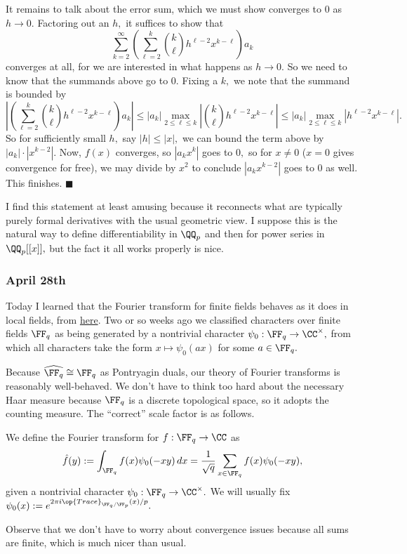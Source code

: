 It remains to talk about the error sum, which we must show converges to $0$ as $h\to0.$ Factoring out an $h,$ it suffices to show that
\[\sum_{k=2}^\infty\left(\sum_{\ell=2}^k\binom k\ell h^{\ell-2}x^{k-\ell}\right)a_k\]
converges at all, for we are interested in what happens as $h\to0.$ So we need to know that the summands above go to $0.$ Fixing a $k,$ we note that the summand is bounded by
\[\left|\left(\sum_{\ell=2}^k\binom k\ell h^{\ell-2}x^{k-\ell}\right)a_k\right|\le|a_k|\max_{2\le\ell\le k}\left|\binom k\ell h^{\ell-2}x^{k-\ell}\right|\le|a_k|\max_{2\le\ell\le k}\left|h^{\ell-2}x^{k-\ell}\right|.\]
So for sufficiently small $h,$ say $|h|\le|x|,$ we can bound the term above by $|a_k|\cdot\left|x^{k-2}\right|.$ Now, $f(x)$ converges, so $\left|a_kx^k\right|$ goes to $0,$ so for $x\ne0$ ($x=0$ gives convergence for free), we may divide by $x^2$ to conclude $\left|a_kx^{k-2}\right|$ goes to $0$ as well. This finishes. $\blacksquare$

I find this statement at least amusing because it reconnects what are typically purely formal derivatives with the usual geometric view. I suppose this is the natural way to define differentiability in $\QQ_p$ and then for power series in $\QQ_p[[x]],$ but the fact it all works properly is nice.

\subsubsection{April 28th}
Today I learned that the Fourier transform for finite fields behaves as it does in local fields, from \href{https://drive.google.com/file/d/1LliHibNgmndXoYlq_gxC-bP-10KWM--Z/view}{here}. Two or so weeks ago we classified characters over finite fields $\FF_q$ as being generated by a nontrivial character $\psi_0:\FF_q\to\CC^\times,$ from which all characters take the form $x\mapsto\psi_0(ax)$ for some $a\in\FF_q.$

Because $\widehat{\FF_q}\cong\FF_q$ as Pontryagin duals, our theory of Fourier transforms is reasonably well-behaved. We don't have to think too hard about the necessary Haar measure because $\FF_q$ is a discrete topological space, so it adopts the counting measure. The ``correct'' scale factor is as follows.
\begin{definition}
    We define the Fourier transform for $f:\FF_q\to\CC$ as
    \[\hat f(y):=\int_{\FF_q}f(x)\psi_0(-xy)\,dx=\frac1{\sqrt q}\sum_{x\in\FF_q}f(x)\psi_0(-xy),\]
    given a nontrivial character $\psi_0:\FF_q\to\CC^\times.$ We will usually fix $\psi_0(x):=e^{2\pi i\op{Trace}_{\FF_q/\FF_p}(x)/p}.$
\end{definition}
Observe that we don't have to worry about convergence issues because all sums are finite, which is much nicer than usual.

